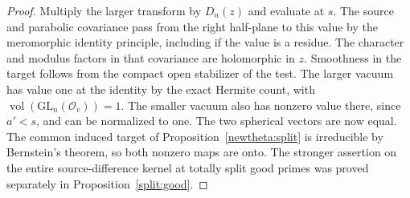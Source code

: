 \begin{proof}
Multiply the larger transform by \(D_n(z)\) and evaluate at \(s\).
The source and parabolic covariance pass from the right half-plane
to this value by the meromorphic identity principle, including if
the value is a residue. The character and modulus factors in that
covariance are holomorphic in \(z\). Smoothness in the target
follows from the compact open stabilizer of the test. The larger
vacuum has value one at the identity by the exact Hermite count,
with \(\operatorname{vol}(\mathrm{GL}_n(\mathcal O_v))=1\).
The smaller vacuum also has nonzero value there, since \(a'<s\),
and can be normalized to one. The two spherical vectors are now
equal. The common induced target of Proposition~\ref{newtheta:split}
is irreducible by Bernstein's theorem, so both nonzero maps are
onto. The stronger assertion on the entire source-difference
kernel at totally split good primes was proved separately in
Proposition~\ref{split:good}.
\end{proof}

